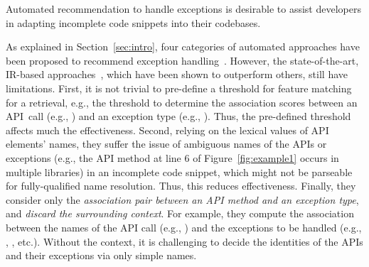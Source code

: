 \begin{Observation} 
\label{ob1}
Automated recommendation to handle exceptions is desirable to
assist developers in adapting incomplete code snippets into their
codebases.
\end{Observation}


As explained in Section~\ref{sec:intro},  four
categories of automated approaches have been proposed to recommend
exception
handling~\cite{xrank-fse20,barbosa-bsse12,chanchal-scam14,barbosa-tse18,barbosa-tse16}.
However, the state-of-the-art, IR-based approaches~\cite{xrank-fse20},
which have been shown to outperform others, still have 
limitations. First, it is not trivial to pre-define a threshold for
feature matching for a retrieval, e.g., the threshold to determine the
association scores between an API~call (e.g., )
and an exception type (e.g., ). Thus,
the pre-defined threshold affects much the effectiveness.
%
Second, relying on the lexical values of API elements' names, they
suffer the issue of ambiguous names of the APIs or exceptions (e.g.,
the API method  at line 6 of Figure~\ref{fig:example1}
occurs in multiple libraries) in an incomplete code snippet, which
might not be parseable for fully-qualified name resolution. Thus, this
reduces effectiveness. Finally, they consider only the {\em
  association pair between an API method and an exception type}, and
{\em discard the surrounding context}.
For example, they compute the association between the names of the API
call (e.g., ) and the exceptions to be
handled (e.g., ,
, etc.). Without the context, it is
challenging to decide the identities of the APIs and their exceptions via
only simple names.

